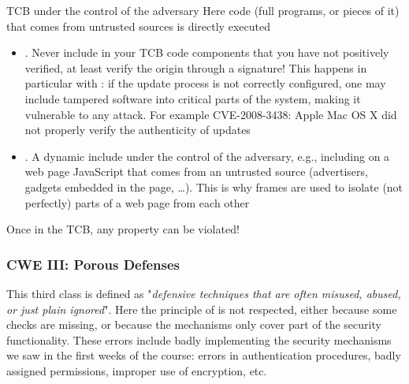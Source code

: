 \begin{parag}{TCB under the control of the adversary}
    Here code (full programs, or pieces of it) that comes from untrusted sources is directly executed
    \begin{itemize}
        \item {}. Never include in your TCB code components that you have not positively verified, at least verify the origin through a signature! This happens in particular with : if the update process is not correctly configured, one may include tampered software into critical parts of the system, making it vulnerable to any attack. For example CVE-2008-3438: Apple Mac OS X did not properly verify the authenticity of updates
        \item {}. A dynamic include under the control of the adversary, e.g., including on a web page JavaScript that comes from an untrusted source (advertisers, gadgets embedded in the page, \dots). This is why frames are used to isolate (not perfectly) parts of a web page from each other
    \end{itemize}
    \begin{center}
        Once in the TCB, any property can be violated!
    \end{center}
\end{parag}

\subsubsection{CWE III: Porous Defenses}
This third class is defined as "\textit{defensive techniques that are often misused, abused, or just plain ignored}". Here the principle of  is not respected, either because some checks are missing, or because the mechanisms only cover part of the security functionality. These errors include badly implementing the security mechanisms we saw in the first weeks of the course: errors in authentication procedures, badly assigned permissions, improper use of encryption, etc.
